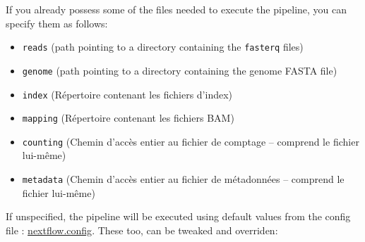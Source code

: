 \documentclass[
  openany]{book}
\providecommand{\tightlist}{%
  \setlength{\itemsep}{0pt}\setlength{\parskip}{0pt}}
\begin{document}
If you already possess some of the files needed to execute the pipeline, you can specify them as follows:

\begin{itemize}
\tightlist
\item
  \texttt{reads} (path pointing to a directory containing the \texttt{fasterq} files)
\item
  \texttt{genome} (path pointing to a directory containing the genome FASTA file)
\item
  \texttt{index} (Répertoire contenant les fichiers d'index)
\item
  \texttt{mapping} (Répertoire contenant les fichiers BAM)
\item
  \texttt{counting} (Chemin d'accès entier au fichier de comptage -- comprend le fichier lui-même)
\item
  \texttt{metadata} (Chemin d'accès entier au fichier de métadonnées -- comprend le fichier lui-même)
\end{itemize}

If unspecified, the pipeline will be executed using default values from the config file : \href{https://github.com/bio-TAGI/Hackathon/blob/main/Nextflow/nextflow.config}{nextflow.config}. These too, can be tweaked and overriden:
\end{document}

